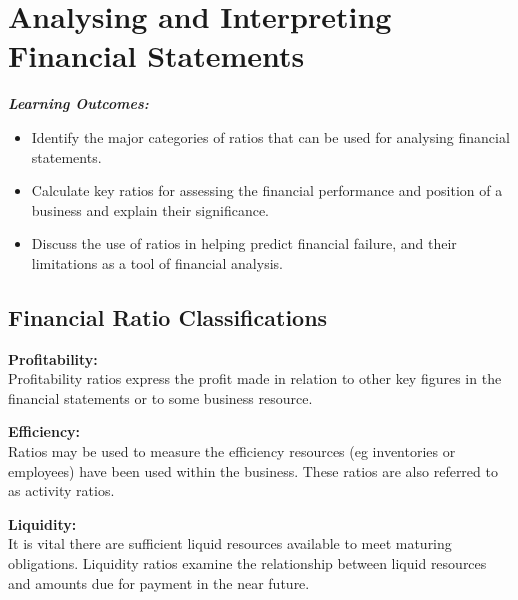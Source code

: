 \documentclass{report}
\newenvironment{blackbox}[1][Black]
  {\begin{tcolorbox}[colframe=#1,colback=white]}
  {\end{tcolorbox}}
\begin{document}
\chapter{Analysing and Interpreting Financial Statements}
\begin{blackbox}
    \textbf{\textit{Learning Outcomes:}}
    \begin{itemize}
        \item Identify the major categories of ratios that can be used for analysing financial statements.
        \item Calculate key ratios for assessing the financial performance and position of a business and explain their significance.
        \item Discuss the use of ratios in helping predict financial failure, and their limitations as a tool of financial analysis.
    \end{itemize}
\end{blackbox}

\section{Financial Ratio Classifications}

\begin{blackbox}
    \textbf{Profitability:}\\
    Profitability ratios express the profit made in relation to other key figures in the financial statements or to some business resource.
\end{blackbox}

\begin{blackbox}
    \textbf{Efficiency:}\\
    Ratios may be used to measure the efficiency resources (eg inventories or employees) have been used within the business. These ratios are also referred to as activity ratios.
\end{blackbox}

\begin{blackbox}
    \textbf{Liquidity:}\\
    It is vital there are sufficient liquid resources available to meet maturing obligations. Liquidity ratios examine the relationship between liquid resources and amounts due for payment in the near future.
\end{blackbox}
\end{document}
